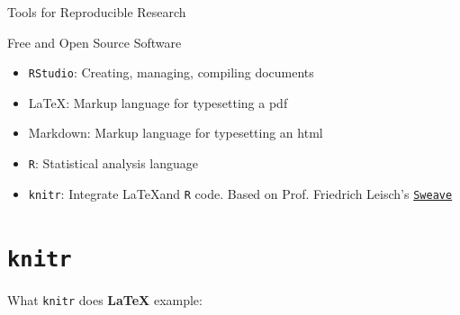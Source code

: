 \documentclass[10pt]{beamer}\usepackage[]{graphicx}\usepackage[]{color}
\begin{document}
\begin{frame}{Tools for Reproducible Research}

\begin{block}{Free and Open Source Software}
\begin{itemize}
\item \texttt{RStudio}: Creating, managing, compiling documents
\item \LaTeX: Markup language for typesetting a pdf
\item Markdown: Markup language for typesetting an html
\item \texttt{R}: Statistical analysis language
\item \texttt{knitr}: Integrate \LaTeX and \texttt{R} code. Based on Prof. Friedrich Leisch's \href{https://www.statistik.lmu.de/~leisch/Sweave/}{\texttt{Sweave}}
\end{itemize}
\end{block}
\end{frame}



\section{\texttt{knitr}}

\begin{frame}{What \texttt{knitr} does}
\textbf{\LaTeX} example:

\begin{center}
\end{center}
\end{frame}
\end{document}
